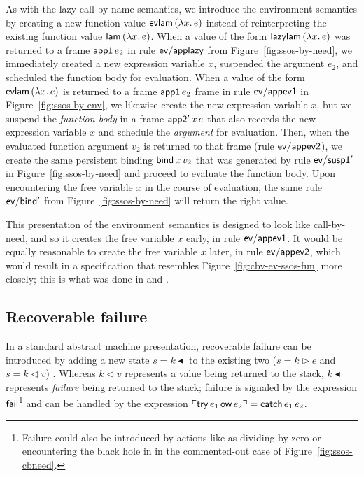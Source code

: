 As with the lazy call-by-name semantics, we introduce the environment
semantics by creating a new function value ${\sf evlam}\,(\lambda
x.\,e)$ instead of reinterpreting the existing function value ${\sf
  lam}\,(\lambda x.\,e)$. When a value of the form ${\sf
  lazylam}\,(\lambda x.\,e)$ was returned to a frame ${\sf app1}\,e_2$
in rule ${\sf ev/applazy}$ from Figure~\ref{fig:ssos-by-need}, we
immediately created a new expression variable $x$, suspended the
argument $e_2$, and scheduled the function body for evaluation. When a
value of the form ${\sf evlam}\,(\lambda x.\,e)$ is returned to a
frame ${\sf app1}\,e_2$ frame in rule ${\sf ev/appev1}$ in
Figure~\ref{fig:ssos-by-env}, we likewise create the new expression
variable $x$, but we suspend the {\it function body} in a frame ${\sf
  app2'}\,x\,e$ that also records the new expression variable $x$ and
schedule the {\it argument} for evaluation. Then, when the evaluated
function argument $v_2$ is returned to that frame (rule ${\sf
  ev/appev2}$), we create the same persistent binding ${\sf
  bind}\,x\,v_2$ that was generated by rule ${\sf ev/susp1'}$ in
Figure~\ref{fig:ssos-by-need} and proceed to evaluate the function
body. Upon encountering the free variable $x$ in the course of
evaluation, the same rule ${\sf ev/bind'}$ from
Figure~\ref{fig:ssos-by-need} will return the right value.

This presentation of the environment semantics is designed to look
like call-by-need, and so it creates the free variable $x$ early, in
rule ${\sf ev/appev1}$.  It would be equally reasonable to create the
free variable $x$ later, in rule ${\sf ev/appev2}$, which would result
in a specification that resembles
Figure~\ref{fig:cbv-ev-ssos-fun} more closely; this is what
was done in \cite{pfenning09substructural} and
\cite{simmons11logical}.



\subsection{Recoverable failure}
\label{sec:failure}

In a standard abstract machine presentation, recoverable failure can 
be introduced by adding a new state $s = k {\blacktriangleleft}$
to the existing two ($s = k \rhd e$ and $s = k \lhd v$)
\cite[Chapter 28]{harper12practical}. Whereas $k
\lhd v$ represents a value being returned to the stack, $k
{\blacktriangleleft}$ represents {\it failure} being returned to the
stack; failure is signaled by the expression ${\sf fail}$\footnote{Failure 
could also be introduced by actions like as dividing
by zero or encountering the black hole in in the commented-out case of
Figure~\ref{fig:ssos-cbneed}.} and
can be handled by the expression ${\ulcorner{{\sf try}\,e_1\,{\sf ow}\,e_2}\urcorner} = 
{\sf catch}\,e_1\,e_2$. 

